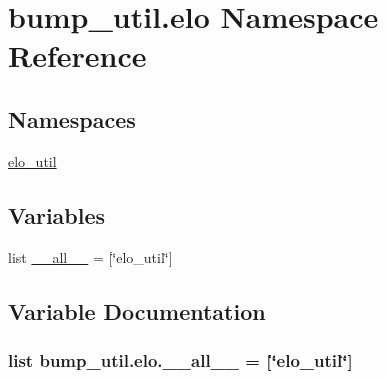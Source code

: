 \hypertarget{namespacebump__util_1_1elo}{}\section{bump\+\_\+util.\+elo Namespace Reference}
\label{namespacebump__util_1_1elo}
\subsection*{Namespaces}
\begin{DoxyCompactItemize}
\item 
 \hyperlink{namespacebump__util_1_1elo_1_1elo__util}{elo\+\_\+util}
\end{DoxyCompactItemize}
\subsection*{Variables}
\begin{DoxyCompactItemize}
\item 
list \hyperlink{namespacebump__util_1_1elo_aef604e299d2b637a62b95cb9595a8749}{\+\_\+\+\_\+all\+\_\+\+\_\+} = \mbox{[}\char`\"{}elo\+\_\+util\char`\"{}\mbox{]}
\end{DoxyCompactItemize}


\subsection{Variable Documentation}
\hypertarget{namespacebump__util_1_1elo_aef604e299d2b637a62b95cb9595a8749}{}
\subsubsection[{\+\_\+\+\_\+all\+\_\+\+\_\+}]{\setlength{\rightskip}{0pt plus 5cm}list bump\+\_\+util.\+elo.\+\_\+\+\_\+all\+\_\+\+\_\+ = \mbox{[}\char`\"{}elo\+\_\+util\char`\"{}\mbox{]}}\label{namespacebump__util_1_1elo_aef604e299d2b637a62b95cb9595a8749}
